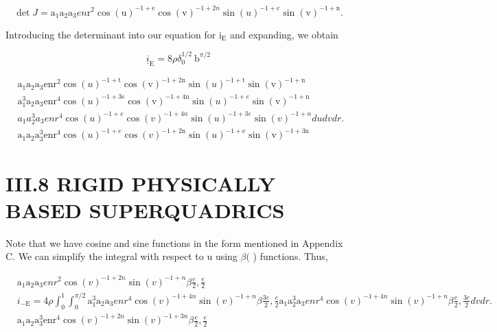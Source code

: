 $$
\operatorname{det} J=\mathrm{a}_{1} \mathrm{a}_{2} \mathrm{a}_{3} e n \mathrm{r}^{2} \cos (\mathrm{u})^{-1+\mathrm{e}} \cos (\mathrm{v})^{-1+2 n} \sin (u)^{-1+e} \sin (\mathrm{v})^{-1+\mathrm{n}} .
$$

Introducing the determinant into our equation for $\mathrm{i}_{\mathrm{E}}$ and expanding, we obtain

$$
\underline{i}_{\mathrm{E}}=8 \rho \delta_{0}^{1 / 2} \mathrm{~b}^{\pi / 2}
$$

$$
\begin{aligned}
& \mathrm{a}_{1} \mathrm{a}_{2} \mathrm{a}_{3} \mathrm{enr}^{2} \cos (u)^{-1+\mathrm{t}} \cos (\mathrm{v})^{-1+2 \mathrm{n}} \sin (u)^{-1+\mathrm{t}} \sin (\mathrm{v})^{-1+\mathrm{n}} \\
& \mathrm{a}_{1}^{3} \mathrm{a}_{2} \mathrm{a}_{3} \mathrm{enr}^{4} \cos (u)^{-1+3 \mathrm{e}} \cos (\mathrm{v})^{-1+4 \mathrm{n}} \sin (u)^{-1+e} \sin (\mathrm{v})^{-1+\mathrm{n}} \\
& a_{1} a_{2}^{3} a_{3} e n r^{4} \cos (u)^{-1+e} \cos (v)^{-1+4 n} \sin (u)^{-1+3 e} \sin (v)^{-1+n} d u d v d r \text {. } \\
& \mathrm{a}_{1} \mathrm{a}_{2} \mathrm{a}_{3}^{3} \mathrm{enr}^{4} \cos (u)^{-1+e} \cos (v)^{-1+2 \mathrm{n}} \sin (u)^{-1+\mathrm{e}} \sin (\mathrm{v})^{-1+3 \mathrm{n}} 
\end{aligned}
$$

\section{III.8 RIGID PHYSICALLY BASED SUPERQUADRICS}
Note that we have cosine and sine functions in the form mentioned in Appendix C. We can simplify the integral with respect to u using $\beta($ ) functions. Thus,

$$
\begin{aligned}
& \mathrm{a}_{1} \mathrm{a}_{2} \mathrm{a}_{3} e n r^{2} \cos (v)^{-1+2 n} \sin (v)^{-1+n} \beta \frac{e}{2}, \frac{e}{2} \\
& i_{-\mathrm{E}}=4 \rho \int_{0}^{1} \int_{0}^{\pi / 2} \mathrm{a}_{1}^{3} \mathrm{a}_{2} \mathrm{a}_{3} e n r^{4} \cos (v)^{-1+4 n} \sin (v)^{-1+n} \beta \frac{3 e}{2}, \frac{e}{2} \mathrm{a}_{1} \mathrm{a}_{2}^{3} \mathrm{a}_{3} e n r^{4} \cos (v)^{-1+4 n} \sin (v)^{-1+n} \beta \frac{e}{2}, \frac{3 e}{2} d v d r . \\
& \mathrm{a}_{1} \mathrm{a}_{2} \mathrm{a}_{3}^{3} \mathrm{enr}^{4} \cos (v)^{-1+2 n} \sin (v)^{-1+3 n} \beta \frac{e}{2}, \frac{e}{2}
\end{aligned}
$$

